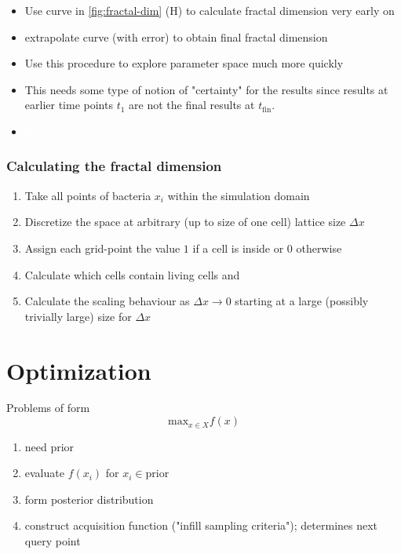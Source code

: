 \documentclass{article}
\newcommand{\todo}[1]{\colorbox{WildStrawberry}{\textcolor{white}{#1}}}
\begin{document}
\begin{itemize}
    \item Use curve in \ref{fig:fractal-dim} (H) to calculate fractal dimension very early on
    \item extrapolate curve (with error) to obtain final fractal dimension
    \item Use this procedure to explore parameter space much more quickly
    \item This needs some type of notion of "certainty" for the results since results at earlier
        time points $t_1$ are not the final results at $t_\text{fin}$.
    \item \todo{Runtime plot of simulation time}
\end{itemize}

\subsubsection{Calculating the fractal dimension}
\begin{enumerate}
    \item Take all points of bacteria $x_i$ within the simulation domain
    \item Discretize the space at arbitrary (up to size of one cell) lattice size $\Delta x$
    \item Assign each grid-point the value $1$ if a cell is inside or $0$ otherwise
    \item Calculate which cells contain living cells and
    \item Calculate the scaling behaviour as $\Delta x\rightarrow0$ starting at a large (possibly
        trivially large) size for $\Delta x$
\end{enumerate}

\section{Optimization}
\label{section:optimization}

Problems of form
\begin{equation}
    \text{max}_{x\in X} f(x)
\end{equation}

\begin{enumerate}
    \item need prior
    \item evaluate $f(x_i)$ for $x_i\in\text{prior}$
    \item form posterior distribution 
    \item construct acquisition function ("infill sampling criteria"); determines next query point
\end{enumerate}
\end{document}
